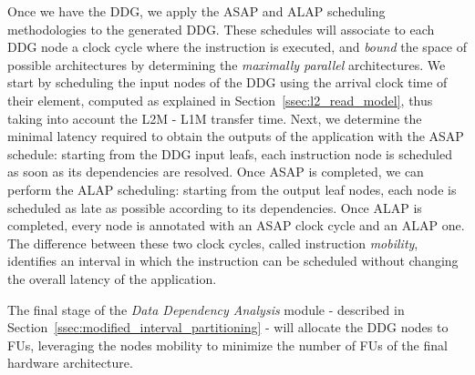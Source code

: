 Once we have the DDG, we apply the ASAP and ALAP scheduling methodologies to the generated DDG. These schedules will associate to each DDG node a clock cycle where the instruction is executed, and \textit{bound} the space of possible architectures by determining the \textit{maximally parallel} architectures. We start by scheduling the input nodes of the DDG using the arrival clock time of their element, computed as explained in Section~\ref{ssec:l2_read_model}, thus taking into account the L2M - L1M transfer time. Next, we determine the minimal latency required to obtain the outputs of the application with the ASAP schedule: starting from the DDG input leafs, each instruction node is scheduled as soon as its dependencies are resolved. 
Once ASAP is completed, we can perform the ALAP scheduling: starting from the output leaf nodes, each node is scheduled as late as possible according to its dependencies. Once ALAP is completed, every node is annotated with an ASAP clock cycle and an ALAP one. The difference between these two clock cycles, called instruction \textit{mobility}, identifies an interval in which the instruction can be scheduled without changing the overall latency of the application.

The final stage of the \textit{Data Dependency Analysis} module - described in Section~\ref{ssec:modified_interval_partitioning} - will allocate the DDG nodes to FUs, leveraging the nodes mobility to minimize the number of FUs of the final hardware architecture. 

\vspace{-2mm}
